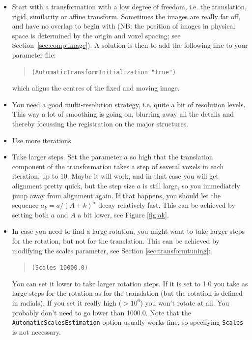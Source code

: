 \documentclass[]{report}
\begin{document}
\begin{itemize}
\item Start with a transformation with a low degree of freedom,
i.e. the translation, rigid, similarity or affine transform.
Sometimes the images are really far off, and have no overlap to
begin with (NB: the position of images in physical space is
determined by the origin and voxel spacing; see
Section~\ref{sec:comp:image}). A solution is then to add the
following line to your parameter file:
\begin{quote}
  \texttt{(AutomaticTransformInitialization "true")}
\end{quote}
which aligns the centres of the fixed and moving image.

\item You need a good multi-resolution strategy, i.e.
quite a bit of resolution levels. This way a lot of smoothing is
going on, blurring away all the details and thereby focussing the
registration on the major structures.

\item Use more iterations.

\item Take larger steps. Set the
parameter $a$ so high that the translation component of the
transformation takes a step of several voxels in each iteration, up
to 10. Maybe it will work, and in that case you will get alignment
pretty quick, but the step size $a$ is still large, so you
immediately jump away from alignment again. If that happens, you
should let the sequence $a_k = a / (A+k)^{\alpha}$ decay relatively
fast. This can be achieved by setting both $a$ and $A$ a bit lower,
see Figure \ref{fig:ak}.

\item In case you need to find a large rotation, you might want to
take larger steps for the rotation, but not for the translation.
This can be achieved by modifying the scales parameter, see
Section \ref{sec:transformtuning}:
\begin{quote}
\texttt{(Scales 10000.0)}
\end{quote}
You can set it lower to take larger rotation steps. If it is set
to 1.0 you take as large steps for the rotation as for the
translation (but the rotation is defined in radials). If you set
it really high ($> 10^6$) you won't rotate at all. You probably
don't need to go lower than 1000.0. Note that the
\texttt{AutomaticScalesEstimation} option usually works fine, so
specifying \texttt{Scales} is not necessary.

\end{itemize}
\end{document}

